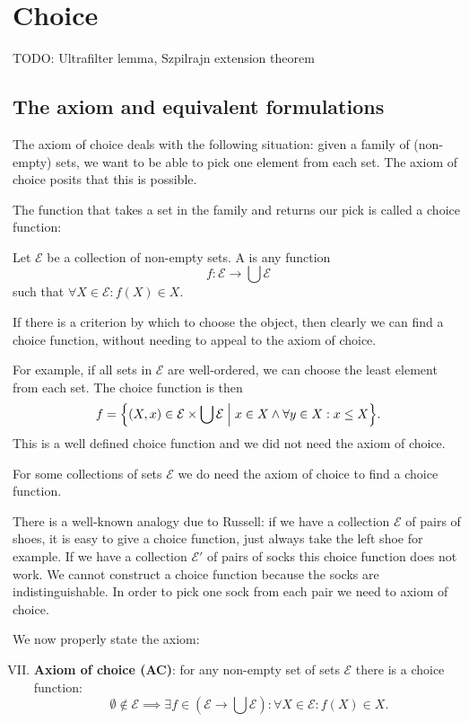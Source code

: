 \section{Choice}
TODO: Ultrafilter lemma, Szpilrajn extension theorem

\subsection{The axiom and equivalent formulations}
The axiom of choice deals with the following situation: given a family of (non-empty) sets, we want to be able to pick one element from each set. The axiom of choice posits that this is possible.

The function that takes a set in the family and returns our pick is called a choice function:
\begin{definition}
Let $\mathcal{E}$ be a collection of non-empty sets. A  is any function
\[ f: \mathcal{E} \to \bigcup \mathcal{E} \]
such that $\forall X\in\mathcal{E}: f(X) \in X$.
\end{definition}

If there is a criterion by which to choose the object, then clearly we can find a choice function, without needing to appeal to the axiom of choice.

For example, if all sets in $\mathcal{E}$ are well-ordered, we can choose the least element from each set. The choice function is then
\[ f = \setbuilder{ (X,x)\in \mathcal{E}\times \bigcup \mathcal{E}}{x\in X \land \forall y \in X: x\leq X }. \]
This is a well defined choice function and we did not need the axiom of choice.

For some collections of sets $\mathcal{E}$ we do need the axiom of choice to find a choice function.

There is a well-known analogy due to Russell: if we have a collection $\mathcal{E}$ of pairs of shoes, it is easy to give a choice function, just always take the left shoe for example. If we have a collection $\mathcal{E}'$ of pairs of socks this choice function does not work. We cannot construct a choice function because the socks are indistinguishable. In order to pick one sock from each pair we need to axiom of choice.

We now properly state the axiom:
\begin{enumerate}[(I)]
\setcounter{enumi}{6}
\item \textbf{Axiom of choice (AC)}: for any non-empty set of sets $\mathcal{E}$ there is a choice function:
\[ \emptyset \notin \mathcal{E} \implies \exists f \in \left(\mathcal{E} \to \bigcup \mathcal{E}\right): \forall X \in \mathcal{E}: f(X)\in X. \]
\end{enumerate}


